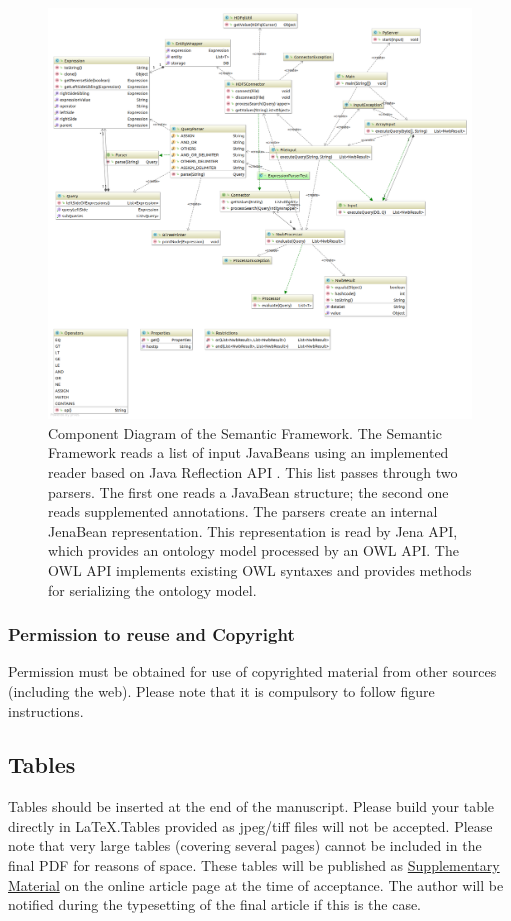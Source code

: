 \documentclass[utf8]{frontiersSCNS} %
\begin{document}
\begin{figure}
  \includegraphics[width=17cm]{diagram}
\caption{Component Diagram of the Semantic Framework. The Semantic Framework reads a list of input JavaBeans using an implemented reader based on Java Reflection API \citep{jlfalcone:sun:06}. This list passes through two parsers. The first one reads a JavaBean structure; the second one reads supplemented annotations. The parsers create an internal JenaBean representation. This representation is read by Jena API, which provides an ontology model processed by an OWL API. The OWL API implements existing OWL syntaxes and provides methods for serializing the ontology model.}
\label{fig:diagram}
\end{figure}

\subsubsection{Permission to reuse and Copyright}
Permission must be obtained for use of copyrighted material from other sources (including the web). Please note that it is compulsory to follow figure instructions. 

\subsection{Tables}
Tables should be inserted at the end of the manuscript. Please build your table directly in LaTeX.Tables provided as jpeg/tiff files will not be accepted. Please note that very large tables (covering several pages) cannot be included in the final PDF for reasons of space. These tables will be published as \href{http://home.frontiersin.org/about/author-guidelines#SupplementaryMaterial}{Supplementary Material} on the online article page at the time of acceptance. The author will be notified during the typesetting of the final article if this is the case. 
\end{document}
